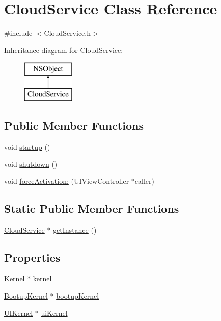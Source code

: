 \hypertarget{interface_cloud_service}{
\section{\-Cloud\-Service \-Class \-Reference}
\label{interface_cloud_service}
}


{\ttfamily \#include $<$\-Cloud\-Service.\-h$>$}

\-Inheritance diagram for \-Cloud\-Service\-:\begin{figure}[H]
\begin{center}
\leavevmode
\includegraphics[height=2.000000cm]{interface_cloud_service}
\end{center}
\end{figure}
\subsection*{\-Public \-Member \-Functions}
\begin{DoxyCompactItemize}
\item 
void \hyperlink{interface_cloud_service_aff6031f833c1fb320f87426fca9e11eb}{startup} ()
\item 
void \hyperlink{interface_cloud_service_ad3ebffc5f1cddabf2480d14d987de69f}{shutdown} ()
\item 
void \hyperlink{interface_cloud_service_a59f48bd9bd6a06315ec5f1e946cfb1c1}{force\-Activation\-:} (\-U\-I\-View\-Controller $\ast$caller)
\end{DoxyCompactItemize}
\subsection*{\-Static \-Public \-Member \-Functions}
\begin{DoxyCompactItemize}
\item 
\hyperlink{interface_cloud_service}{\-Cloud\-Service} $\ast$ \hyperlink{interface_cloud_service_ac78380c69d50df0d62403cbb74e3567f}{get\-Instance} ()
\end{DoxyCompactItemize}
\subsection*{\-Properties}
\begin{DoxyCompactItemize}
\item 
\hyperlink{interface_kernel}{\-Kernel} $\ast$ \hyperlink{interface_cloud_service_a7f7e9e2447b17386b0feaeffefa7feb1}{kernel}
\item 
\hyperlink{interface_bootup_kernel}{\-Bootup\-Kernel} $\ast$ \hyperlink{interface_cloud_service_a5536a0a403267123daf2f067c4bf1a0c}{bootup\-Kernel}
\item 
\hyperlink{interface_u_i_kernel}{\-U\-I\-Kernel} $\ast$ \hyperlink{interface_cloud_service_ae5dd6329209934db41aedacffb209663}{ui\-Kernel}
\end{DoxyCompactItemize}


